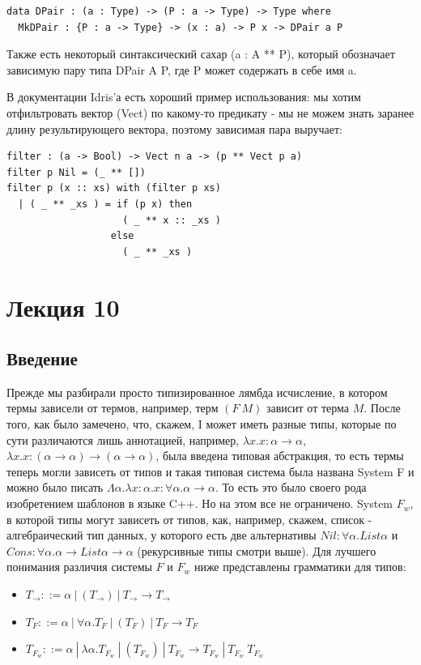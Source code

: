 \begin{verbatim}
data DPair : (a : Type) -> (P : a -> Type) -> Type where
  MkDPair : {P : a -> Type} -> (x : a) -> P x -> DPair a P
\end{verbatim}

Также есть некоторый синтаксический сахар (a : A ** P), который обозначает зависимую пару типа DPair A P, где P может содержать в себе имя a.

В документации Idris'а есть хороший пример использования: мы хотим отфильтровать вектор  (Vect) по какому-то предикату - мы не можем знать заранее длину результирующего вектора, поэтому зависимая пара выручает:

\begin{verbatim}
filter : (a -> Bool) -> Vect n a -> (p ** Vect p a)
filter p Nil = (_ ** [])
filter p (x :: xs) with (filter p xs)
  | ( _ ** _xs ) = if (p x) then 
                    ( _ ** x :: _xs ) 
                  else 
                    ( _ ** _xs )
\end{verbatim}


\section{Лекция 10}

\subsection{Введение}

Прежде мы разбирали просто типизированное лямбда исчисление, в котором термы зависели от термов, например, терм $(F\ M)$ зависит от терма $M$. После того, как было замечено, что, скажем, I может иметь разные типы, которые по сути различаются лишь аннотацией, например, $\lambda x. x : \alpha \rightarrow \alpha$, $\lambda x. x : (\alpha \rightarrow \alpha) \rightarrow (\alpha \rightarrow \alpha)$, была введена типовая абстракция, то есть термы теперь могли зависеть от типов и такая типовая система была названа System F и можно было писать $\Lambda \alpha. \lambda x : \alpha . x : \forall \alpha. \alpha \rightarrow \alpha$. То есть это было своего рода изобретением шаблонов в языке C++. Но на этом все не ограничено. System $F_w$, в которой типы могут зависеть от типов, как, например, скажем, список - алгебраический тип данных, у которого есть две альтернативы $Nil : \forall \alpha . List \alpha$ и $Cons : \forall \alpha. \alpha \rightarrow List \alpha \rightarrow \alpha$ (рекурсивные типы смотри выше). Для лучшего понимания различия системы $F$ и $F_w$ ниже представлены грамматики для типов:
\begin{itemize}
    \item $T_\rightarrow ::= \alpha\ |\ (T_\rightarrow)\ |\ T_\rightarrow \rightarrow T_\rightarrow$
    \item $T_F ::= \alpha\ |\ \forall \alpha. T_F\ |\ (T_F)\ |\ T_F \rightarrow T_F$ 
    \item $T_{F_w} ::= \alpha\ |\ \lambda \alpha. T_{F_w}\ |\ (T_{F_w})\ |\ T_{F_w} \rightarrow T_{F_w}\ |\ T_{F_w}\ T_{F_w} $
\end{itemize}

